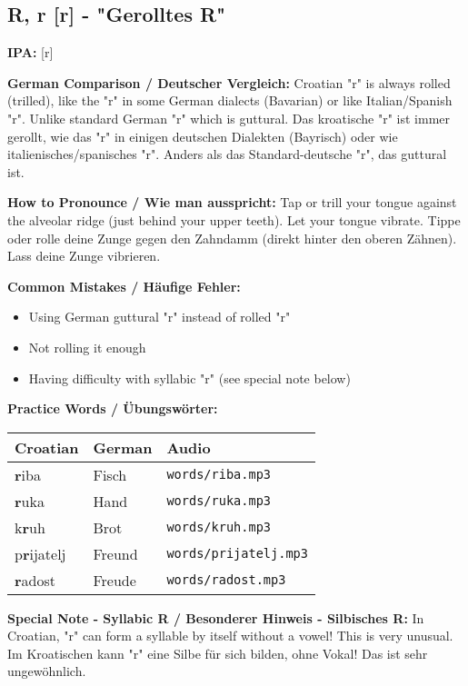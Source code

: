 \subsection{R, r [r] - "Gerolltes R"}

\begin{tcolorbox}[colback=lightyellow!30, colframe=orange, title=\textbf{R, r}]

\textbf{IPA:} [r]

\textbf{German Comparison / Deutscher Vergleich:}
Croatian "r" is always rolled (trilled), like the "r" in some German dialects (Bavarian) or like Italian/Spanish "r". Unlike standard German "r" which is guttural.
Das kroatische "r" ist immer gerollt, wie das "r" in einigen deutschen Dialekten (Bayrisch) oder wie italienisches/spanisches "r". Anders als das Standard-deutsche "r", das guttural ist.

\textbf{How to Pronounce / Wie man ausspricht:}
Tap or trill your tongue against the alveolar ridge (just behind your upper teeth). Let your tongue vibrate.
Tippe oder rolle deine Zunge gegen den Zahndamm (direkt hinter den oberen Zähnen). Lass deine Zunge vibrieren.

\textbf{Common Mistakes / Häufige Fehler:}
\begin{itemize}
    \item Using German guttural "r" instead of rolled "r"
    \item Not rolling it enough
    \item Having difficulty with syllabic "r" (see special note below)
\end{itemize}

\textbf{Practice Words / Übungswörter:}
\begin{tabular}{lll}
\textbf{Croatian} & \textbf{German} & \textbf{Audio} \\
\midrule
\textbf{r}iba & Fisch & \texttt{words/riba.mp3} \\
\textbf{r}uka & Hand & \texttt{words/ruka.mp3} \\
k\textbf{r}uh & Brot & \texttt{words/kruh.mp3} \\
p\textbf{r}ijatelj & Freund & \texttt{words/prijatelj.mp3} \\
\textbf{r}adost & Freude & \texttt{words/radost.mp3} \\
\end{tabular}

\textbf{Special Note - Syllabic R / Besonderer Hinweis - Silbisches R:}
In Croatian, "r" can form a syllable by itself without a vowel! This is very unusual.
Im Kroatischen kann "r" eine Silbe für sich bilden, ohne Vokal! Das ist sehr ungewöhnlich.


\end{tcolorbox}
